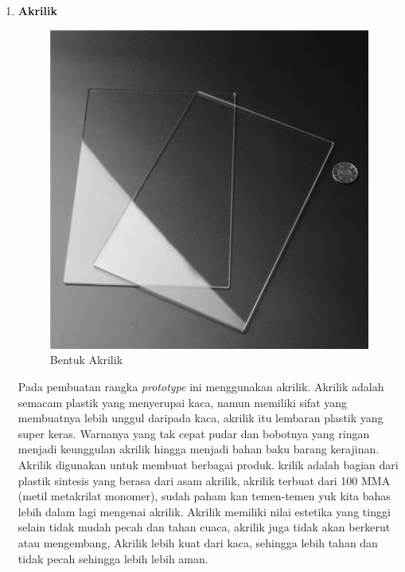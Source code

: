 \begin{enumerate}
\item \textbf{Akrilik}
\begin{figure}[H]
\centering
\includegraphics[width=1\textwidth]{figures/akrilik.jpg}
\caption{Bentuk Akrilik}
\label{print}
\end{figure}
\par Pada pembuatan rangka \textit{prototype} ini menggunakan akrilik. Akrilik adalah semacam plastik yang menyerupai kaca, namun memiliki sifat yang membuatnya lebih unggul daripada kaca, akrilik itu lembaran plastik yang super keras. Warnanya yang tak cepat pudar dan bobotnya yang ringan menjadi keunggulan akrilik hingga menjadi bahan baku barang kerajinan. Akrilik digunakan untuk membuat berbagai produk.  krilik adalah bagian dari plastik sintesis yang berasa dari asam akrilik, akrilik terbuat dari 100 MMA (metil metakrilat monomer), sudah paham kan temen-temen yuk kita bahas lebih dalam lagi mengenai akrilik. Akrilik memiliki nilai estetika yang tinggi selain tidak mudah pecah dan tahan cuaca, akrilik juga tidak akan berkerut atau mengembang, Akrilik lebih kuat dari kaca, sehingga lebih tahan dan tidak pecah sehingga lebih lebih aman.


\end{enumerate}

